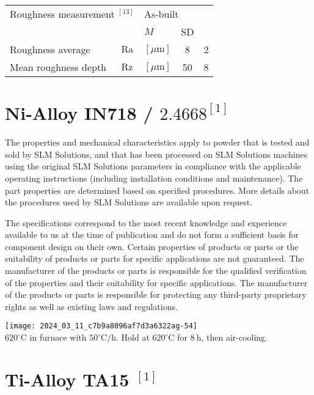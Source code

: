 \documentclass[10pt]{article}
\begin{document}
\begin{center}
\begin{tabular}{|l|ll|c|c|}
\hline
\multicolumn{2}{|l|}{Roughness measurement ${ }^{[13]}$} & \multicolumn{2}{l|}{As-built} &  \\
\cline { 4 - 5 }
\multicolumn{2}{|l|}{} & $M$ & SD &  \\
\hline
Roughness average & $\mathrm{Ra}$ & $[\mu \mathrm{m}]$ & 8 & 2 \\
\hline
Mean roughness depth & $\mathrm{Rz}$ & $[\mu \mathrm{m}]$ & 50 & 8 \\
\hline
\end{tabular}
\end{center}

\section*{Ni-Alloy IN718 / $2.4668^{[1]}$}
The properties and mechanical characteristics apply to powder that is tested and sold by SLM Solutions, and that has been processed on SLM Solutions machines using the original SLM Solutions parameters in compliance with the applicable operating instructions (including installation conditions and maintenance). The part properties are determined based on specified procedures. More details about the procedures used by SLM Solutions are available upon request.

The specifications correspond to the most recent knowledge and experience available to us at the time of publication and do not form a sufficient basis for component design on their own. Certain properties of products or parts or the suitability of products or parts for specific applications are not guaranteed. The manufacturer of the products or parts is responsible for the qualified verification of the properties and their suitability for specific applications. The manufacturer of the products or parts is responsible for protecting any third-party proprietary rights as well as existing laws and regulations.

\texttt{[image: 2024\_03\_11\_c7b9a8096af7d3a6322ag-54]}\\
$620^{\circ} \mathrm{C}$ in furnace with $50^{\circ} \mathrm{C} / \mathrm{h}$. Hold at $620^{\circ} \mathrm{C}$ for $8 \mathrm{~h}$, then air-cooling.

\section*{Ti-Alloy TA15 ${ }^{[1]}$}
\end{document}
